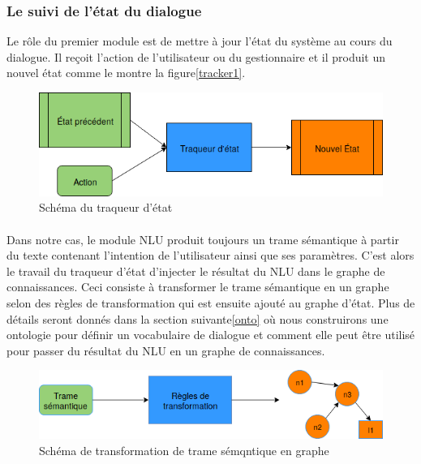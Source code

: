 \subsubsection{Le suivi de l'état du dialogue}
Le rôle du premier module est de mettre à jour l'état du système au cours du dialogue. Il reçoit l'action de l'utilisateur ou du gestionnaire et il produit un nouvel état comme le montre la figure\ref{tracker1}.
\begin{figure}[H] 
	
	\centering
	\includegraphics[width=0.6\linewidth]{images/Conception/DM/Tracker1.png}
	\caption{Schéma du traqueur d'état}
\end{figure}\label{tracker1}
\paragraph{}
Dans notre cas, le module NLU produit toujours un trame sémantique à partir du texte contenant l'intention de l'utilisateur ainsi que ses paramètres. C'est alors le travail du traqueur d'état d'injecter le résultat du NLU dans le graphe de connaissances. Ceci consiste à transformer le trame sémantique en un graphe selon des règles de transformation qui est ensuite ajouté au graphe d'état. Plus de détails seront donnés dans la section suivante\ref{onto} où nous construirons une ontologie pour définir un vocabulaire de dialogue et comment elle peut être utilisé pour passer du résultat du NLU en un graphe de connaissances.
\begin{figure}[H] 
	
	\centering
	\includegraphics[width=0.6\linewidth]{images/Conception/DM/Transformer.png}
	\caption{Schéma de transformation de trame sémqntique en graphe}
\end{figure}\label{transformer}
